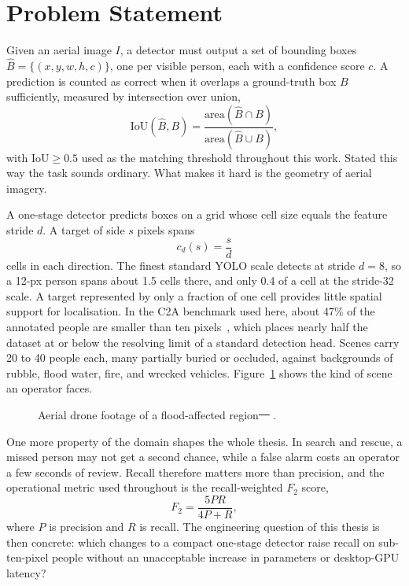 \documentclass[12pt,a4paper,oneside]{report}
\providecommand{\DIFdel}[1]{{\protect\color{red}\sout{#1}}}                      %
\providecommand{\DIFdelFL}[1]{\DIFdel{#1}} %
\providecommand{\DIFdelbeginFL}{} %
\providecommand{\DIFdelendFL}{} %
\begin{document}
\section{Problem Statement}
Given an aerial image $I$, a detector must output a set of bounding boxes
$\hat{B} = \{(x, y, w, h, c)\}$, one per visible person, each with a confidence
score $c$. A prediction is counted as correct when it overlaps a ground-truth
box $B$ sufficiently, measured by intersection over union,
\begin{equation}
  \mathrm{IoU}(\hat{B}, B) =
    \frac{\mathrm{area}(\hat{B} \cap B)}{\mathrm{area}(\hat{B} \cup B)},
  \label{eq:iou}
\end{equation}
with $\mathrm{IoU} \geq 0.5$ used as the matching threshold throughout this
work. Stated this way the task sounds ordinary. What makes it hard is the
geometry of aerial imagery.

A one-stage detector predicts boxes on a grid whose cell size equals the
feature stride $d$. A target of side $s$ pixels spans
\begin{equation}
  c_d(s) = \frac{s}{d}
  \label{eq:coverage}
\end{equation}
cells in each direction. The finest standard YOLO scale detects at stride
$d = 8$, so a 12-px person spans about 1.5 cells there, and only 0.4 of a cell
at the stride-32 scale. A target represented by only a fraction of one cell
provides little spatial support for localisation. In the C2A benchmark used here, about 47\% of the
annotated people are smaller than ten pixels~\cite{nihal2024c2a}, which places
nearly half the dataset at or below the resolving limit of a standard
detection head. Scenes carry 20 to 40 people each, many partially buried or
occluded, against backgrounds of rubble, flood water, fire, and wrecked
vehicles. Figure~\ref{fig:introscene} shows the kind of scene an operator
faces.

\begin{figure}[tbp]
  \centering
  \caption{Aerial drone footage of a flood-affected region\DIFdelbeginFL \DIFdelFL{~\mbox{%
\cite{agiindia2024drones}}\hskip0pt%
}\DIFdelendFL .}
  \label{fig:introscene}
\end{figure}

One more property of the domain shapes the whole thesis. In search and rescue,
a missed person may not get a second chance, while a false alarm costs an
operator a few seconds of review. Recall therefore matters more than
precision, and the operational metric used throughout is the recall-weighted
$F_2$ score,
\begin{equation}
  F_2 = \frac{5PR}{4P + R},
  \label{eq:f2}
\end{equation}
where $P$ is precision and $R$ is recall. The engineering question of this
thesis is then concrete: which changes to a compact one-stage detector raise
recall on sub-ten-pixel people without an unacceptable increase in parameters
or desktop-GPU latency?
\end{document}
